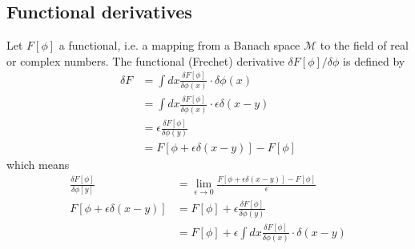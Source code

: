 \documentclass[10pt,a4paper]{article}
\theoremstyle{definition}
\begin{document}
\subsection{Functional derivatives}
Let $F[\phi]$ a functional, i.e. a mapping from a Banach space $\mathcal{M}$ to the field of real or complex numbers. The functional (Frechet) derivative $\delta F[\phi]/\delta\phi$ is defined by
\begin{align}
    \delta F
    &=\int dx \frac{\delta F[\phi]}{\delta\phi(x)}\cdot\delta\phi(x)\\
    &=\int dx \frac{\delta F[\phi]}{\delta\phi(x)}\cdot\epsilon\delta(x-y)\\
    &=\epsilon\frac{\delta F[\phi]}{\delta\phi(y)}\\
    &=F[\phi+\epsilon\delta(x-y)]-F[\phi]
\end{align}
which means
\begin{align}
    \frac{\delta F[\phi]}{\delta\phi[y]}&=\lim_{\epsilon\rightarrow0}\frac{F[\phi+\epsilon\delta(x-y)]-F[\phi]}{\epsilon}\\
    F[\phi+\epsilon\delta(x-y)]&=F[\phi]+\epsilon\frac{\delta F[\phi]}{\delta\phi(y)}\\
    &=F[\phi]+\epsilon\int dx \frac{\delta F[\phi]}{\delta\phi(x)}\cdot\delta(x-y)
\end{align}
\end{document}
